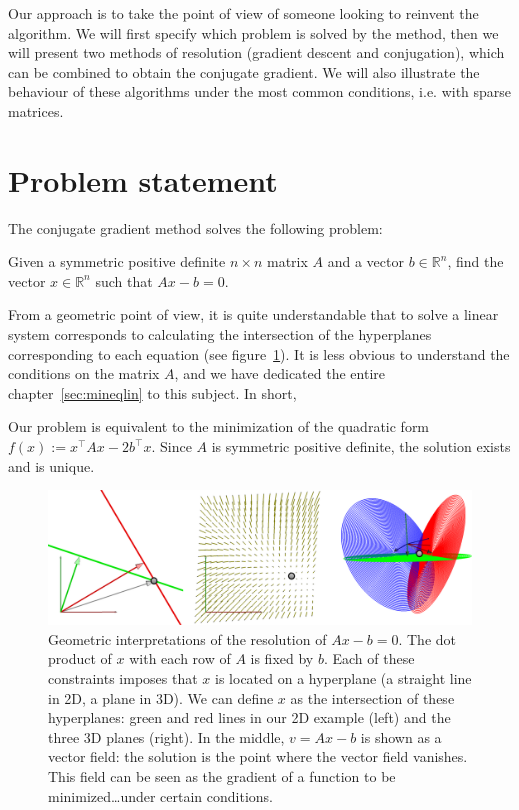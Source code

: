 \documentclass[notitlepage,oneside]{book}
\begin{document}
Our approach is to take the point of view of someone looking to reinvent the algorithm.
We will first specify which problem is solved by the method, then we will present two methods of resolution (gradient descent and conjugation),
which can be combined to obtain the conjugate gradient.
We will also illustrate the behaviour of these algorithms under the most common conditions, i.e. with sparse matrices.



\section{Problem statement}

The conjugate gradient method solves the following problem:

\begin{framed}
Given  a symmetric positive definite $n\times n$ matrix $A$ and a vector $b \in {\mathbb R}^n$, find the vector $x \in {\mathbb R}^n$ such that $Ax - b =0$.
\end{framed}

From a geometric point of view, it is quite understandable that to solve a linear system corresponds to calculating the intersection of
the hyperplanes corresponding to each equation (see figure~\ref{fig:pbd2d}).
It is less obvious to understand the conditions on the matrix $A$, and we have dedicated the entire chapter~\ref{sec:mineqlin} to this subject.
In short,
\begin{framed}
Our problem is equivalent to the minimization of the quadratic form $f(x):=x^\top Ax-2b^\top x$. Since $A$ is symmetric positive definite, the solution exists and is unique.
\end{framed}

\begin{figure}[htb]
  \centering
  \includegraphics[width=.8\linewidth]{cg/problem2d.png}
  \caption{Geometric interpretations of the resolution of $Ax-b=0$.
  The dot product of $x$ with each row of $A$ is fixed by $b$.
  Each of these constraints imposes that $x$ is located on a hyperplane (a straight line in 2D, a plane in 3D).
  We can define $x$ as the intersection of these hyperplanes: green and red lines in our 2D example (left) and the three 3D planes (right).
  In the middle, $v=Ax-b$ is shown as a vector field: the solution is the point where the vector field vanishes.
  This field can be seen as  the gradient of a function to be minimized\dots under certain conditions.}
  \label{fig:pbd2d}
\end{figure}
\end{document}

